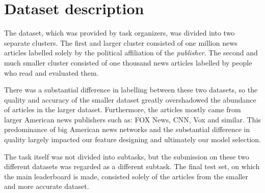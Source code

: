 \section{Dataset description}
\label{sec:task}

The dataset, which was provided by task organizers, was divided into two separate clusters. The first and larger cluster consisted of one million news articles labelled solely by the political affiliation of the \textit{publisher}. The second and much smaller cluster consisted of one thousand news articles labelled by people who read and evaluated them. 

There was a substantial difference in labelling between these two datasets, so the quality and accuracy of the smaller dataset greatly overshadowed the abundance of articles in the larger dataset.
Furthermore, the articles mostly came from larger American news publishers such as: FOX News, CNN, Vox and similar. This predominance of big American news networks and the substantial difference in quality largely impacted our feature designing and ultimately our model selection.

The task itself was not divided into subtasks, but the submission on these two different datasets was regarded as a different subtask. The final test set, on which the main leaderboard is made, consisted solely of the articles from the smaller and more accurate dataset.